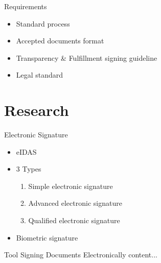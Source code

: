 \documentclass[utf8, xcolor, usenames,dvipsnames, aspectratio=169]{beamer}
\begin{document}
\begin{frame}{Requirements}
	\begin{itemize}
		\item Standard process
		\item Accepted documents format
		\item Transparency \& Fulfillment signing guideline
		\item Legal standard
	\end{itemize}
\end{frame}

\section{Research}
\begin{frame}{Electronic Signature}
	\begin{itemize}
		\item eIDAS 
		\item 3 Types
		\begin{enumerate}
			\item Simple electronic signature
			\item Advanced electronic signature
			\item Qualified electronic signature
		\end{enumerate}
		\item Biometric signature 
	\end{itemize}
\end{frame}

\begin{frame}{Tool Signing Documents Electronically}
	content...
\end{frame}
\end{document}
